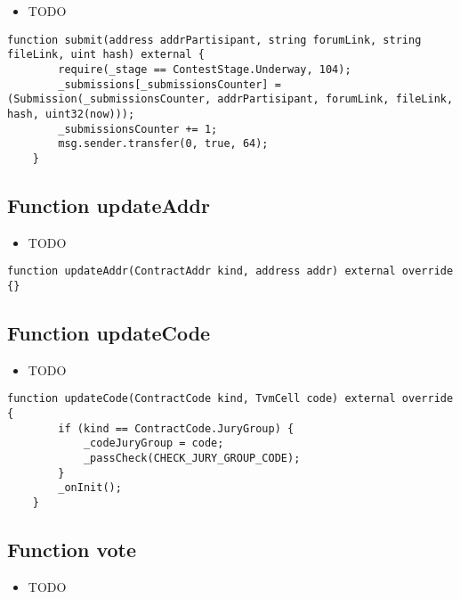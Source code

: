 \begin{itemize}
\item TODO
\end{itemize}

\begin{lstlisting}[firstnumber=121]
    function submit(address addrPartisipant, string forumLink, string fileLink, uint hash) external {
        require(_stage == ContestStage.Underway, 104);
        _submissions[_submissionsCounter] = (Submission(_submissionsCounter, addrPartisipant, forumLink, fileLink, hash, uint32(now)));
        _submissionsCounter += 1;
        msg.sender.transfer(0, true, 64);
    }
\end{lstlisting}

\subsection{Function updateAddr}

\begin{itemize}
\item TODO
\end{itemize}

\begin{lstlisting}[firstnumber=81]
    function updateAddr(ContractAddr kind, address addr) external override {}
\end{lstlisting}

\subsection{Function updateCode}

\begin{itemize}
\item TODO
\end{itemize}

\begin{lstlisting}[firstnumber=73]
    function updateCode(ContractCode kind, TvmCell code) external override {
        if (kind == ContractCode.JuryGroup) {
            _codeJuryGroup = code;
            _passCheck(CHECK_JURY_GROUP_CODE);
        }
        _onInit();
    }
\end{lstlisting}

\subsection{Function vote}

\begin{itemize}
\item TODO
\end{itemize}

